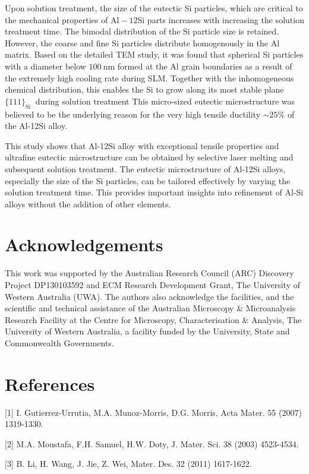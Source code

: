 \documentclass[10pt]{article}
\begin{document}
Upon solution treatment, the size of the eutectic Si particles, which are critical to the mechanical properties of $\mathrm{Al}-12 \mathrm{Si}$ parts increases with increasing the solution treatment time. The bimodal distribution of the Si particle size is retained. However, the coarse and fine Si particles distribute homogenously in the $\mathrm{Al}$ matrix. Based on the detailed TEM study, it was found that spherical Si particles with a diameter below $100 \mathrm{~nm}$ formed at the $\mathrm{Al}$ grain boundaries as a result of the extremely high cooling rate during SLM. Together with the inhomogeneous chemical distribution, this enables the Si to grow along its most stable plane $\{111\}_{\text {Si }}$ during solution treatment This micro-sized eutectic microstructure was believed to be the underlying reason for the very high tensile ductility $\sim 25 \%$ of the Al-12Si alloy.

This study shows that Al-12Si alloy with exceptional tensile properties and ultrafine eutectic microstructure can be obtained by selective laser melting and subsequent solution treatment. The eutectic microstructure of Al-12Si alloys, especially the size of the Si particles, can be tailored effectively by varying the solution treatment time. This provides important insights into refinement of Al-Si alloys without the addition of other elements.

\section*{Acknowledgements}
This work was supported by the Australian Research Council (ARC) Discovery Project DP130103592 and ECM Research Development Grant, The University of Western Australia (UWA). The authors also acknowledge the facilities, and the scientific and technical assistance of the Australian Microscopy \& Microanalysis Research Facility at the Centre for Microscopy, Characterisation \& Analysis, The University of Western Australia, a facility funded by the University, State and Commonwealth Governments.

\section*{References}
[1] I. Gutierrez-Urrutia, M.A. Munoz-Morris, D.G. Morris, Acta Mater. 55 (2007) 1319-1330.

[2] M.A. Moustafa, F.H. Samuel, H.W. Doty, J. Mater. Sci. 38 (2003) 4523-4534.

[3] B. Li, H. Wang, J. Jie, Z. Wei, Mater. Des. 32 (2011) 1617-1622.
\end{document}
